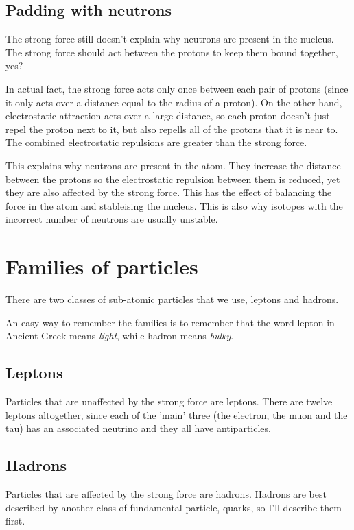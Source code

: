 \documentclass{article}
\begin{document}
\subsection*{Padding with neutrons}

The strong force still doesn't explain why neutrons are present in the nucleus.
The strong force should act between the protons to keep them bound together,
yes?

In actual fact, the strong force acts only once between each pair of protons
(since it only acts over a distance equal to the radius of a proton). On the
other hand, electrostatic attraction acts over a large distance, so each proton
doesn't just repel the proton next to it, but also repells all of the protons
that it is near to. The combined electrostatic repulsions are greater than the
strong force.

This explains why neutrons are present in the atom. They increase the distance
between the protons so the electrostatic repulsion between them is reduced, yet
they are also affected by the strong force. This has the effect of balancing the
force in the atom and stableising the nucleus. This is also why isotopes with
the incorrect number of neutrons are usually unstable.

\section*{Families of particles}

There are two classes of sub-atomic particles that we use, leptons and hadrons.

An easy way to remember the families is to remember that the word lepton in
Ancient Greek means {\it light}, while hadron means {\it bulky}.

\subsection*{Leptons}

Particles that are unaffected by the strong force are leptons. There are twelve
leptons altogether, since each of the 'main' three (the electron, the muon and
the tau) has an associated neutrino and they all have antiparticles.

\subsection*{Hadrons}

Particles that are affected by the strong force are hadrons. Hadrons are best
described by another class of fundamental particle, quarks, so I'll describe
them first.
\end{document}
